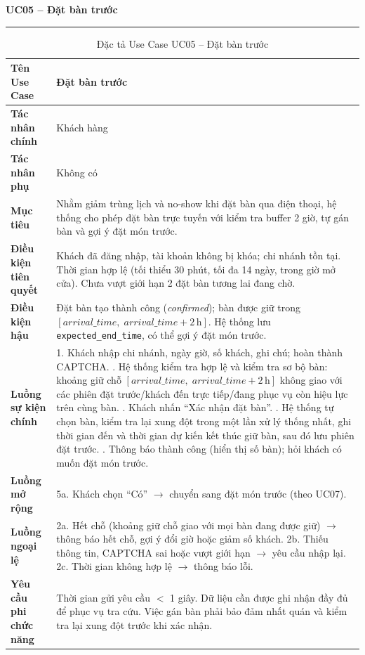 ﻿\documentclass[../DoAn.tex]{subfiles}
\newcommand{\UCtitle}[1]{%
    \vspace{0.5em}
    {\large\bfseries #1}\\[-0.5em]
    \rule{\textwidth}{0.5pt}
    \vspace{0.3em}
}
\begin{document}
\begin{table}[H]
\UCtitle{UC05 – Đặt bàn trước}
\centering
\small
\begin{tabular}{|p{3.5cm}|p{10.7cm}|}
\hline
\textbf{Tên Use Case} & Đặt bàn trước \\ \hline
\textbf{Tác nhân chính} & Khách hàng \\ \hline
\textbf{Tác nhân phụ} & Không có \\ \hline
\textbf{Mục tiêu} &
Nhằm giảm trùng lịch và no-show khi đặt bàn qua điện thoại, hệ thống cho phép đặt bàn trực tuyến với kiểm tra buffer 2 giờ, tự gán bàn và gợi ý đặt món trước.
\\ \hline
\textbf{Điều kiện tiên quyết} &
Khách đã đăng nhập, tài khoản không bị khóa; chi nhánh tồn tại. Thời gian hợp lệ (tối thiểu 30 phút, tối đa 14 ngày, trong giờ mở cửa). Chưa vượt giới hạn 2 đặt bàn tương lai đang chờ.
\\ \hline
\textbf{Điều kiện hậu} &
Đặt bàn tạo thành công (\textit{confirmed}); bàn được giữ trong $[\mathit{arrival\_time},\; \mathit{arrival\_time}+2\,\mathrm{h}]$. Hệ thống lưu \texttt{expected\_end\_time}, có thể gợi ý đặt món trước.
\\ \hline
\textbf{Luồng sự kiện chính} &
1. Khách nhập chi nhánh, ngày giờ, số khách, ghi chú; hoàn thành CAPTCHA. \newline
2. Hệ thống kiểm tra hợp lệ và kiểm tra sơ bộ bàn: khoảng giữ chỗ $[\mathit{arrival\_time},\; \mathit{arrival\_time}+2\,\mathrm{h}]$ không giao với các phiên đặt trước/khách đến trực tiếp/đang phục vụ còn hiệu lực trên cùng bàn. \newline
3. Khách nhấn ``Xác nhận đặt bàn''. \newline
4. Hệ thống tự chọn bàn, kiểm tra lại xung đột trong một lần xử lý thống nhất, ghi thời gian đến và thời gian dự kiến kết thúc giữ bàn, sau đó lưu phiên đặt trước. \newline
5. Thông báo thành công (hiển thị số bàn); hỏi khách có muốn đặt món trước.
\\ \hline
\textbf{Luồng mở rộng} &
5a. Khách chọn ``Có'' $\rightarrow$ chuyển sang đặt món trước (theo UC07).
\\ \hline
\textbf{Luồng ngoại lệ} &
2a. Hết chỗ (khoảng giữ chỗ giao với mọi bàn đang được giữ) $\rightarrow$ thông báo hết chỗ, gợi ý đổi giờ hoặc giảm số khách. \newline
2b. Thiếu thông tin, CAPTCHA sai hoặc vượt giới hạn $\rightarrow$ yêu cầu nhập lại. \newline
2c. Thời gian không hợp lệ $\rightarrow$ thông báo lỗi.
\\ \hline
\textbf{Yêu cầu phi chức năng} &
Thời gian gửi yêu cầu $<$ 1 giây. Dữ liệu cần được ghi nhận đầy đủ để phục vụ tra cứu. Việc gán bàn phải bảo đảm nhất quán và kiểm tra lại xung đột trước khi xác nhận.
\\ \hline
\end{tabular}
\caption{Đặc tả Use Case UC05 – Đặt bàn trước}
\end{table}
\end{document}
